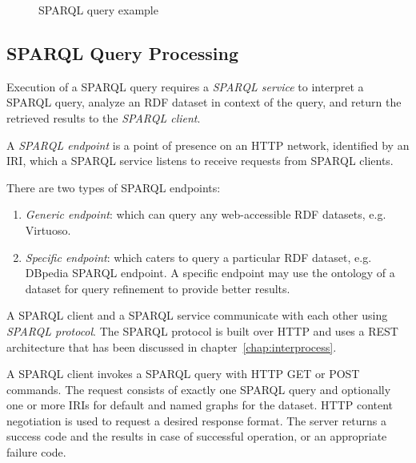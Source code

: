 \begin{figure}[!htbp]
	\centerline{
	}
	\caption{SPARQL query example}
	\label{fig:knowledge:sparql}
\end{figure}


\subsection{SPARQL Query Processing}

 
Execution of a SPARQL query requires a {\em SPARQL service} to interpret a SPARQL query, analyze an RDF dataset in context of 
the query, and return the retrieved results to the {\em SPARQL client}. 

  
\begin{definition} 
	A {\em SPARQL endpoint} is a point of presence on an HTTP network, identified by an IRI, which a SPARQL service listens 
	to receive requests from SPARQL clients.
\end{definition}

\noindent
There are two types of SPARQL endpoints:

\begin{enumerate}
	\item {\em Generic endpoint}: which can query any web-accessible RDF datasets, e.g.
		Virtuoso.
	\item {\em Specific endpoint}: which caters to query a particular RDF dataset, e.g.
		DBpedia SPARQL endpoint.
		A specific endpoint may use the ontology of a dataset for query refinement to 
		provide better results.
\end{enumerate}

  
\begin{definition} 
	A SPARQL client and a SPARQL service communicate with each other using {\em SPARQL protocol}. The SPARQL protocol
	is built over HTTP and uses a REST architecture that has been discussed in chapter~\ref{chap:interprocess}.
\end{definition}

\noindent
A SPARQL client invokes a SPARQL query with  HTTP GET or POST commands. The request consists of exactly one SPARQL query and
optionally one or more IRIs for default and named graphs for the dataset. HTTP content negotiation is used to request a desired
response format. The server returns a success code and the results in case of successful operation, or an appropriate failure code.

